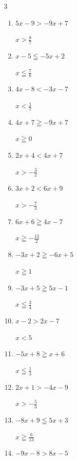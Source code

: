 \begin{multicols}{3}
\begin{enumerate}
        $\displaystyle x\leqq -\frac{4}{9}$

  \item $5x-9>-9x+7$

        $\displaystyle x>\frac{8}{7}$

  \item $x-5\leqq -5x+2$

        $\displaystyle x\leqq \frac{7}{6}$

  \item $4x-8<-3x-7$

        $\displaystyle x<\frac{1}{7}$

  \item $4x+7\geqq -9x+7$

        $\displaystyle x\geqq 0$

  \item $2x+4<4x+7$

        $\displaystyle x>-\frac{3}{2}$

  \item $3x+2<6x+9$

        $\displaystyle x>-\frac{7}{3}$

  \item $6x+6\geqq 4x-7$

        $\displaystyle x\geqq -\frac{13}{2}$

  \item $-3x+2\geqq -6x+5$

        $\displaystyle x\geqq 1$

  \item $-3x+5\geqq 5x-1$

        $\displaystyle x\leqq \frac{3}{4}$

  \item $x-2>2x-7$

        $\displaystyle x<5$

  \item $-5x+8\geqq x+6$

        $\displaystyle x\leqq \frac{1}{3}$

  \item $2x+1>-4x-9$

        $\displaystyle x>-\frac{5}{3}$

\columnbreak %

  \item $-8x+9\leqq 5x+3$

        $\displaystyle x\geqq \frac{6}{13}$

  \item $-9x-8>8x-5$


\end{enumerate}
\end{multicols}
